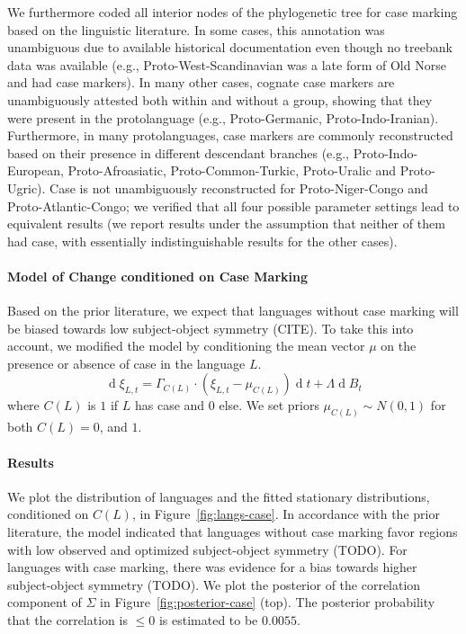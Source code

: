 \documentclass[11pt,a4paper]{article}
\begin{document}
We furthermore coded all interior nodes of the phylogenetic tree for case marking based on the linguistic literature.
In some cases, this annotation was unambiguous due to available historical documentation even though no treebank data was available (e.g., Proto-West-Scandinavian was a late form of Old Norse and had case markers).
In many other cases, cognate case markers are unambiguously attested both within and without a group, showing that they were present in the protolanguage (e.g., Proto-Germanic, Proto-Indo-Iranian).
Furthermore, in many protolanguages, case markers are commonly reconstructed based on their presence in different descendant branches (e.g., Proto-Indo-European, Proto-Afroasiatic, Proto-Common-Turkic, Proto-Uralic and Proto-Ugric). %
Case is not unambiguously reconstructed for Proto-Niger-Congo and Proto-Atlantic-Congo; we verified that all four possible parameter settings lead to equivalent results (we report results under the assumption that neither of them had case, with essentially indistinguishable results for the other cases).

\paragraph{Model of Change conditioned on Case Marking}
Based on the prior literature, we expect that languages without case marking will be biased towards low subject-object symmetry (CITE).
To take this into account, we modified the model by conditioning the mean vector $\mu$ on the presence or absence of case in the language $L$.
\begin{equation*}
    \operatorname{d}\xi_{L,t} = \Gamma_{C(L)} \cdot (\xi_{L,t}-\mu_{C(L)}) \operatorname{d}t + \Lambda \operatorname{d}B_t
\end{equation*}
where $C(L)$ is $1$ if $L$ has case and $0$ else.
We set priors $\mu_{C(L)} \sim N(0,1)$ for both $C(L) = 0$, and $1$.


\paragraph{Results}
We plot the distribution of languages and the fitted stationary distributions, conditioned on $C(L)$, in Figure~\ref{fig:langs-case}.
In accordance with the prior literature, the model indicated that languages without case marking favor regions with low observed and optimized subject-object symmetry (TODO).
For languages with case marking, there was evidence for a bias towards higher subject-object symmetry (TODO).
We plot the posterior of the correlation component of $\Sigma$ in Figure~\ref{fig:posterior-case} (top).
The posterior probability that the correlation is $\leq 0$ is estimated to be $0.0055$.
\end{document}
